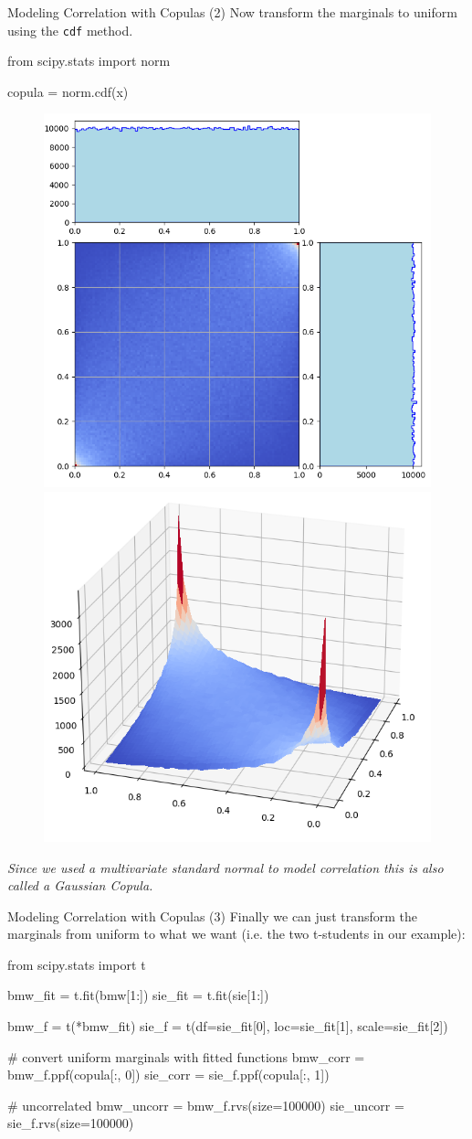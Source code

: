 \documentclass{beamer}
\begin{document}
\begin{frame}[fragile]{Modeling Correlation with Copulas (2)}
  Now transform the marginals to uniform using the \texttt{cdf} method. 
  \begin{ipython}
from scipy.stats import norm

copula = norm.cdf(x)    
\end{ipython}
  \begin{figure}[h]
    \begin{center}
      \includegraphics[width=0.4\linewidth]{copula_2d} \quad
      \includegraphics[width=0.4\linewidth]{copula_3d}
    \end{center}
  \end{figure}
  \emph{Since we used a multivariate standard normal to model correlation this is also called a Gaussian Copula.}
\end{frame}

\begin{frame}[fragile]{Modeling Correlation with Copulas (3)}
 Finally we can just transform the marginals from uniform to what we want (i.e. the two t-students in our example):
\begin{ipython}
from scipy.stats import t

bmw_fit = t.fit(bmw[1:])
sie_fit = t.fit(sie[1:])

bmw_f = t(*bmw_fit)
sie_f = t(df=sie_fit[0], loc=sie_fit[1], scale=sie_fit[2])

# convert uniform marginals with fitted functions
bmw_corr = bmw_f.ppf(copula[:, 0])
sie_corr = sie_f.ppf(copula[:, 1])

# uncorrelated
bmw_uncorr = bmw_f.rvs(size=100000)
sie_uncorr = sie_f.rvs(size=100000)
\end{ipython}
\end{frame}
\end{document}
